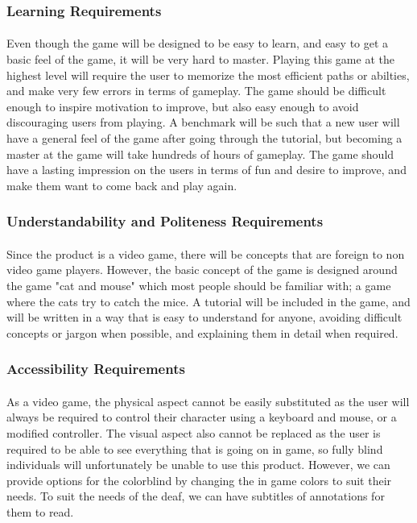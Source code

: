 \documentclass[12pt, titlepage]{article}
\begin{document}
\subsubsection{Learning Requirements}
\paragraph{}Even though the game will be designed to be easy to learn, and easy to get a basic feel of the game, it will be very hard to master. Playing this game at the highest level will require the user to memorize the most efficient paths or abilties, and make very few errors in terms of gameplay. The game should be difficult enough to inspire motivation to improve, but also easy enough to avoid discouraging users from playing. A benchmark will be such that a new user will have a general feel of the game after going through the tutorial, but becoming a master at the game will take hundreds of hours of gameplay. The game should have a lasting impression on the users in terms of fun and desire to improve, and make them want to come back and play again. 
\subsubsection{Understandability and Politeness Requirements}
\paragraph{}Since the product is a video game, there will be concepts that are foreign to non video game players. However, the basic concept of the game is designed around the game "cat and mouse" which most people should be familiar with; a game where the cats try to catch the mice. A tutorial will be included in the game, and will be written in a way that is easy to understand for anyone, avoiding difficult concepts or jargon when possible, and explaining them in detail when required. 
\subsubsection{Accessibility Requirements}
\paragraph{}As a video game, the physical aspect cannot be easily substituted as the user will always be required to control their character using a keyboard and mouse, or a modified controller. The visual aspect also cannot be replaced as the user is required to be able to see everything that is going on in game, so fully blind individuals will unfortunately be unable to use this product. However, we can provide options for the colorblind by changing the in game colors to suit their needs. To suit the needs of the deaf, we can have subtitles of annotations for them to read. 
\end{document}
